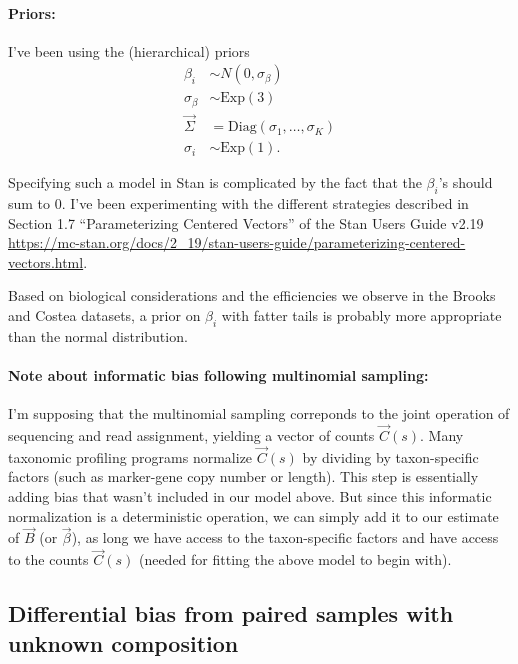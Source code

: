 \paragraph{Priors:}

I've been using the (hierarchical) priors
\begin{align}
  \label{eq:priors}
  \beta_i &\sim N(0, \sigma_\beta)
  \\ \sigma_\beta &\sim \mathrm{Exp}(3)
  \\ \vec \Sigma &= \mathrm{Diag}(\sigma_1, \dots, \sigma_K)
  \\ \sigma_i &\sim \mathrm{Exp}(1).
\end{align}

Specifying such a model in Stan is complicated by the fact that the $\beta_i$'s
should sum to $0$. I've been experimenting with the different strategies
described in Section 1.7 ``Parameterizing Centered Vectors'' of the Stan Users Guide
v2.19
\url{https://mc-stan.org/docs/2_19/stan-users-guide/parameterizing-centered-vectors.html}.

Based on biological considerations and the efficiencies we observe in the
Brooks and Costea datasets, a prior on $\beta_i$ with fatter tails is probably
more appropriate than the normal distribution.

\paragraph{Note about informatic bias following multinomial sampling:}

I'm supposing that the multinomial sampling correponds to the joint operation
of sequencing and read assignment, yielding a vector of counts $\vec C{(s)}$.
Many taxonomic profiling programs normalize $\vec C{(s)}$ by dividing by
taxon-specific factors (such as marker-gene copy number or length). This step
is essentially adding bias that wasn't included in our model above.  But since
this informatic normalization is a deterministic operation, we can simply add
it to our estimate of $\vec B$ (or $\vec \beta$), as long we have access to the
taxon-specific factors and have access to the counts $\vec C{(s)}$ (needed for
fitting the above model to begin with).

\subsection{Differential bias from paired samples with unknown composition}

